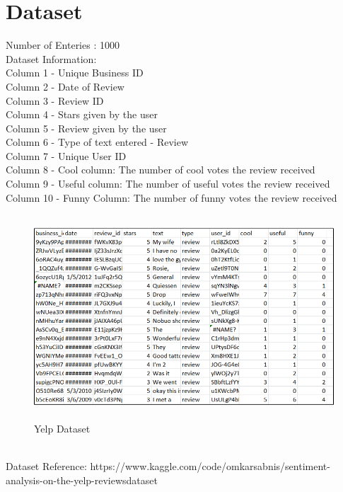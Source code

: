 \documentclass[a4paper, 12pt]{report}
\begin{document}
\section{Dataset}
Number of Enteries : 1000\\
Dataset Information:\\
Column 1 - Unique Business ID\\
Column 2 - Date of Review\\
Column 3 - Review ID\\
Column 4 - Stars given by the user\\
Column 5 - Review given by the user\\
Column 6 - Type of text entered - Review\\
Column 7 - Unique User ID\\
Column 8 - Cool column: The number of cool votes the review received\\
Column 9 - Useful column: The number of useful votes the review received\\
Column 10 - Funny Column: The number of funny votes the review received\\
\begin{figure}[h]
	\includegraphics[height=3in,width=6in]{d}
	\caption{Yelp Dataset}
	\label{Fig.}
\end{figure}
\\Dataset Reference: https://www.kaggle.com/code/omkarsabnis/sentiment-analysis-on-the-yelp-reviewsdataset
\end{document}
